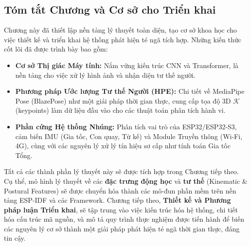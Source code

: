 \subsection{Tóm tắt Chương và Cơ sở cho Triển khai}
\label{sec:chapter_conclusion}

Chương này đã thiết lập nền tảng lý thuyết toàn diện, tạo cơ sở khoa học cho việc thiết kế và triển khai hệ thống phát hiện té ngã tích hợp. Những kiến thức cốt lõi đã được trình bày bao gồm:
\begin{itemize}
    \item \textbf{Cơ sở Thị giác Máy tính:} Nắm vững kiến trúc CNN và Transformer, là nền tảng cho việc xử lý hình ảnh và nhận diện tư thế người.
    \item \textbf{Phương pháp Ước lượng Tư thế Người (HPE):} Chi tiết về MediaPipe Pose (BlazePose) như một giải pháp thời gian thực, cung cấp tọa độ 3D $\mathcal{K}$ (keypoints) làm dữ liệu đầu vào cho các thuật toán phân tích hành vi.
    \item \textbf{Phần cứng Hệ thống Nhúng:} Phân tích vai trò của ESP32/ESP32-S3, cảm biến IMU (Gia tốc, Con quay, Từ kế) và Module Truyền thông (Wi-Fi, 4G), cùng với các nguyên lý xử lý tín hiệu sơ cấp như tính toán Gia tốc Tổng.
\end{itemize}

Tất cả các thành phần lý thuyết này sẽ được tích hợp trong Chương tiếp theo. Cụ thể, mô hình lý thuyết về các \textbf{đặc trưng động học} và \textbf{tư thế} (Kinematic \& Postural Features) sẽ được chuyển hóa thành các mô-đun phần mềm trên nền tảng ESP-IDF và các Framework. Chương tiếp theo, \textbf{Thiết kế và Phương pháp luận Triển khai}, sẽ tập trung vào việc kiến trúc hóa hệ thống, chi tiết hóa cấu trúc mã nguồn, và mô tả quy trình thực nghiệm được tiến hành để biến các nguyên lý cơ sở thành một giải pháp phát hiện té ngã thời gian thực, đáng tin cậy.

